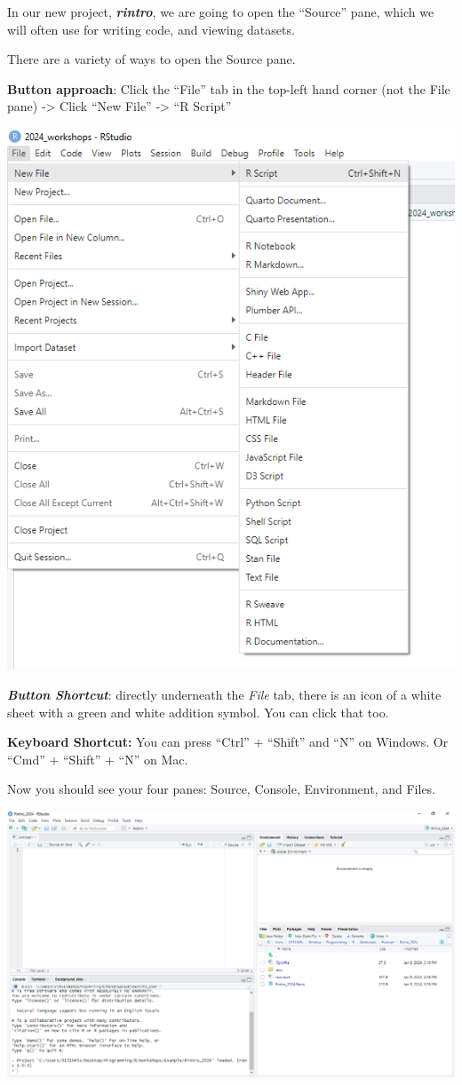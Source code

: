 \documentclass[
]{book}
\begin{document}
In our new project, \textbf{\emph{rintro}}, we are going to open the ``Source'' pane, which we will often use for writing code, and viewing datasets.

There are a variety of ways to open the Source pane.

\textbf{Button approach}: Click the ``File'' tab in the top-left hand corner (not the File pane) -\textgreater{} Click ``New File'' -\textgreater{} ``R Script''

\includegraphics{img/rstudio_create_file.png}

\textbf{\emph{Button Shortcut}}: directly underneath the \emph{File} tab, there is an icon of a white sheet with a green and white addition symbol. You can click that too.

\textbf{Keyboard Shortcut:} You can press ``Ctrl'' + ``Shift'' and ``N'' on Windows. Or ``Cmd'' + ``Shift'' + ``N'' on Mac.

Now you should see your four panes: Source, Console, Environment, and Files.

\includegraphics{img/01-four-panes.png}
\end{document}
